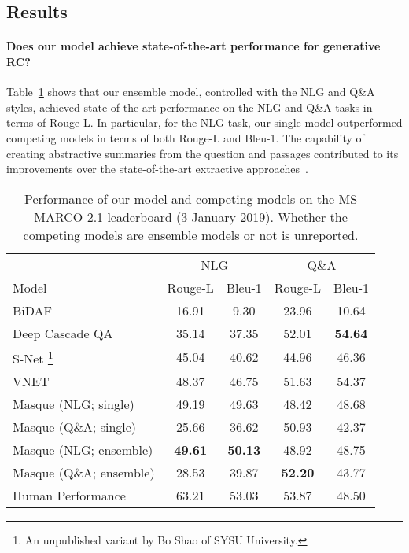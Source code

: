 \documentclass[11pt,a4paper]{article}
\theoremstyle{mydef}
\theoremstyle{myprob}
\begin{document}
\subsection{Results} 

\paragraph{Does our model achieve state-of-the-art performance for generative RC?}

Table~\ref{tb:nlg-leaderboard} shows that 
our ensemble model, controlled with the NLG and Q\&A styles, achieved state-of-the-art performance on the NLG and Q\&A tasks in terms of Rouge-L.  In particular, for the NLG task, our single model outperformed competing models in terms of both Rouge-L and Bleu-1.
The capability of creating abstractive summaries from the question and passages contributed to its improvements over the state-of-the-art extractive approaches~\citep{WuWLHWLLL18,YanAAAI19}.  

\begin{table}
\centering
{\small \tabcolsep=1.4pt
\begin{tabular}{l|cc|cc}
\hline
 & \multicolumn{2}{c|}{NLG} & \multicolumn{2}{c}{Q\&A}\\ %
Model & Rouge-L & Bleu-1 & Rouge-L & Bleu-1\\ \hline
BiDAF \citeyearpar{SeoKFH17} & 16.91 & 9.30 & 23.96 & 10.64 \\
Deep Cascade QA \citeyearpar{YanAAAI19} & 35.14 & 37.35 &  52.01 & {\bf 54.64}\\ 
S-Net \citeyearpar{TanWYDLZ18}\footnote{An unpublished variant by Bo Shao of SYSU University.}   & 45.04 & 40.62 & 44.96 & 46.36\\
VNET \citeyearpar{WuWLHWLLL18}  & 48.37 & 46.75 & 51.63 & 54.37\\ \hline
Masque (NLG; single) & 49.19 &  49.63 & 48.42 & 48.68\\
Masque (Q\&A; single) & 25.66 & 36.62 & 50.93 & 42.37\\ 
\hline
Masque (NLG; ensemble) & {\bf 49.61} & {\bf 50.13} & 48.92& 48.75 \\
Masque (Q\&A; ensemble) & 28.53 & 39.87 & {\bf 52.20} & 43.77 \\ 
\hline
Human Performance & 63.21 & 53.03  & 53.87 & 48.50\\
\hline
\end{tabular}
}
\caption{Performance of our model and competing models on the MS MARCO 2.1 leaderboard (3 January 2019). 
Whether the competing models are ensemble models or not is unreported. }
\label{tb:nlg-leaderboard}
\end{table}
\end{document}
